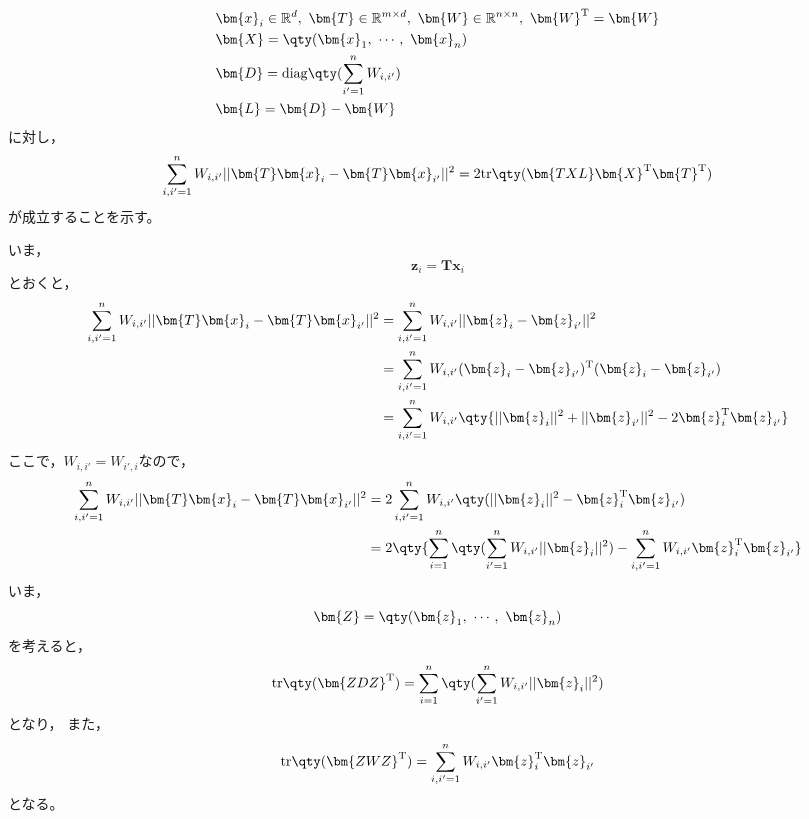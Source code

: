 \documentclass[class=jsarticle, crop=false, dvipdfmx, fleqn]{standalone}
\begin{document}
\section{}

\begin{align}
    & \bm{x}_i \in \mathbb{R}^{d},\ \bm{T} \in \mathbb{R}^{m \times d},\ \bm{W} \in \mathbb{R}^{n \times n},\ \bm{W}^\mathrm{T} = \bm{W} \\
    & \bm{X} = \qty(\bm{x}_1,\ \cdots,\ \bm{x}_n) \\
    & \bm{D} = \mathrm{diag}\qty(\sum_{i' = 1}^{n} W_{i, i'}) \\
    & \bm{L} = \bm{D} - \bm{W}
\end{align}
に対し，
\begin{equation}
    \sum_{i, i' = 1}^{n} W_{i, i'} ||\bm{T} \bm{x}_i - \bm{T} \bm{x}_{i'}||^2 = 2 \mathrm{tr}\qty(\bm{TXL}\bm{X}^\mathrm{T} \bm{T}^\mathrm{T})
    \label{eq:objective}
\end{equation}
が成立することを示す。

いま，
\begin{equation}
    \bm{z}_i = \bm{T} \bm{x}_i
\end{equation}
とおくと，
\begin{align*}
    \sum_{i, i' = 1}^{n} W_{i, i'} ||\bm{T} \bm{x}_i - \bm{T} \bm{x}_{i'}||^2
        & = \sum_{i, i' = 1}^{n} W_{i, i'} ||\bm{z}_i - \bm{z}_{i'}||^2 \\
        & = \sum_{i, i' = 1}^{n} W_{i, i'} (\bm{z}_i - \bm{z}_{i'})^\mathrm{T} (\bm{z}_i - \bm{z}_{i'}) \\
        & = \sum_{i, i' = 1}^{n} W_{i, i'} \qty{||\bm{z}_i||^2 + ||\bm{z}_{i'}||^2 - 2 \bm{z}_i^\mathrm{T} \bm{z}_{i'}}
\end{align*}
ここで，\(W_{i, i'} = W_{i', i}\)なので，
\begin{align}
    \sum_{i, i' = 1}^{n} W_{i, i'} ||\bm{T} \bm{x}_i - \bm{T} \bm{x}_{i'}||^2
        & = 2 \sum_{i, i' = 1}^{n} W_{i, i'} \qty(||\bm{z}_i||^2 - \bm{z}_i^\mathrm{T} \bm{z}_{i'}) \notag \\
        & = 2 \qty{\sum_{i=1}^{n} \qty(\sum_{i'=1}^{n} W_{i,i'} ||\bm{z}_i||^2) - \sum_{i, i' = 1}^{n} W_{i, i'} \bm{z}_i^\mathrm{T} \bm{z}_{i'}}
        \label{eq:inter}
\end{align}
いま，
\begin{equation}
    \bm{Z} = \qty(\bm{z}_1,\ \cdots,\ \bm{z}_n)
\end{equation}
を考えると，
\begin{equation}
    \mathrm{tr}\qty(\bm{ZDZ}^\mathrm{T}) = \sum_{i=1}^{n} \qty(\sum_{i'=1}^{n} W_{i,i'} ||\bm{z}_i||^2)
    \label{eq:ZDZ}
\end{equation}
となり，
また，
\begin{equation}
    \mathrm{tr}\qty(\bm{ZWZ}^\mathrm{T}) = \sum_{i, i' = 1}^{n} W_{i, i'} \bm{z}_i^\mathrm{T} \bm{z}_{i'}
    \label{eq:ZWZ}
\end{equation}
となる。
\end{document}
